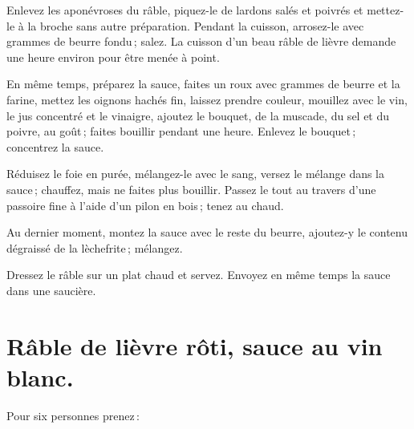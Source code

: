 Enlevez les aponévroses du râble, piquez-le de lardons salés et poivrés et
mettez-le à la broche sans autre préparation. Pendant la cuisson, arrosez-le
avec {\mmm} grammes de beurre fondu ; salez. La cuisson d'un beau râble
de lièvre demande une heure environ pour être menée à point.

En même temps, préparez la sauce, faites un roux avec {\mmm} grammes de
beurre et la farine, mettez les oignons hachés fin, laissez prendre couleur,
mouillez avec le vin, le jus concentré et le vinaigre, ajoutez le bouquet, de
la muscade, du sel et du poivre, au goût ; faites bouillir pendant une heure.
Enlevez le bouquet ; concentrez la sauce.

Réduisez le foie en purée, mélangez-le avec le sang, versez le mélange dans la
sauce ; chauffez, mais ne faites plus bouillir. Passez le tout au travers d'une
passoire fine à l'aide d’un pilon en bois ; tenez au chaud.

Au dernier moment, montez la sauce avec le reste du beurre, ajoutez-y le
contenu dégraissé de la lèchefrite ; mélangez.

Dressez le râble sur un plat chaud et servez. Envoyez en même temps la sauce
dans une saucière.

\section*{\centering Râble de lièvre rôti, sauce au vin blanc.}
{}

Pour six personnes prenez :

